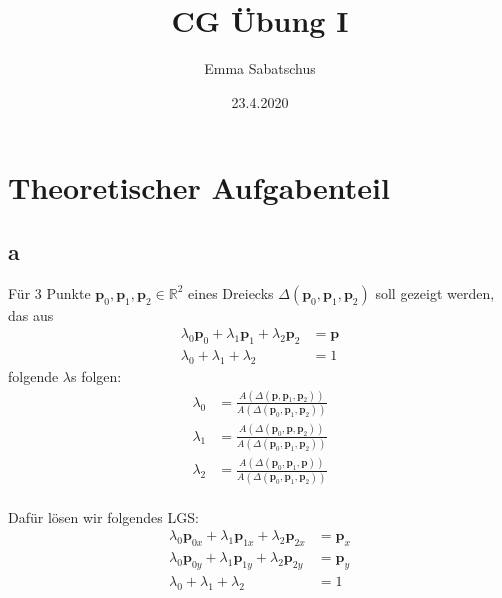 \documentclass[fontsize=10pt,a4paper]{scrartcl}
\title{CG Übung I}
\author{Emma Sabatschus}
\date{23.4.2020}
\begin{document}
\maketitle

\section{Theoretischer Aufgabenteil}
\subsection{a}
Für 3 Punkte $\mathbf{p}_0,\mathbf{p}_1,\mathbf{p}_2\in \mathbb{R}^2$
eines Dreiecks $\Delta(\mathbf{p}_0,\mathbf{p}_1,\mathbf{p}_2)$
soll gezeigt werden, das aus
\begin{align*}
	\lambda_0\mathbf{p}_0+\lambda_1\mathbf{p}_1+\lambda_2\mathbf{p}_2&=\mathbf{p}\\
	\lambda_0+\lambda_1+\lambda_2&=1
\end{align*}
folgende $\lambda$s folgen:
\begin{align*}
	\lambda_0 & =\frac{A(\Delta(\mathbf{p},\mathbf{p}_1,\mathbf{p}_2))}{A(\Delta(\mathbf{p}_0,\mathbf{p}_1,\mathbf{p}_2))} \\
	\lambda_1 & =\frac{A(\Delta(\mathbf{p}_0,\mathbf{p},\mathbf{p}_2))}{A(\Delta(\mathbf{p}_0,\mathbf{p}_1,\mathbf{p}_2))} \\
	\lambda_2 & =\frac{A(\Delta(\mathbf{p}_0,\mathbf{p}_1,\mathbf{p}))}{A(\Delta(\mathbf{p}_0,\mathbf{p}_1,\mathbf{p}_2))} \\
\end{align*}

Dafür lösen wir folgendes LGS:
\begin{align}
	\lambda_0\mathbf{p}_{0x}+\lambda_1\mathbf{p}_{1x}+\lambda_2\mathbf{p}_{2x}&=\mathbf{p}_x\\
	\lambda_0\mathbf{p}_{0y}+\lambda_1\mathbf{p}_{1y}+\lambda_2\mathbf{p}_{2y}&=\mathbf{p}_y\\
	\lambda_0+\lambda_1+\lambda_2&=1
\end{align}
\end{document}
